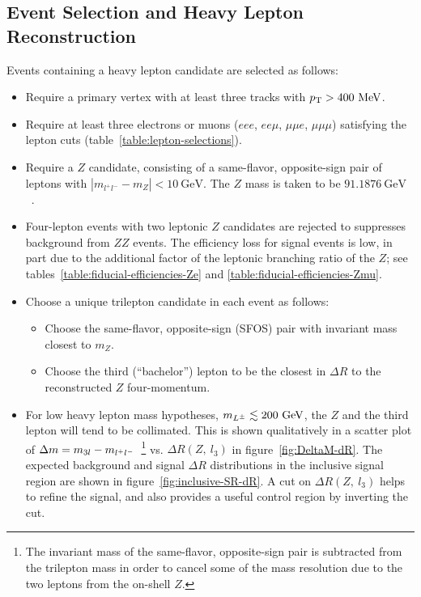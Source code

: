 \subsection{Event Selection and Heavy Lepton Reconstruction}\label{sec:event-3l-selection}
Events containing a heavy lepton candidate are selected as follows:
\begin{itemize}
	\item Require a primary vertex with at least three tracks with $p_{\text{T}}>400~\mbox{MeV}$.
	\item Require at least three electrons or muons ($eee$, $ee\mu$, $\mu\mu e$, $\mu\mu\mu$) satisfying the lepton cuts (table~\ref{table:lepton-selections}). 
	\item Require a $Z$ candidate, consisting of a same-flavor, opposite-sign pair of leptons with $|m_{l^+l^-}-m_{Z}|<10~\mbox{GeV}$. The $Z$ mass is taken to be $91.1876~\mbox{GeV}$~\cite{PhysRevD.86.010001}. 
	\item Four-lepton events with two leptonic $Z$ candidates are rejected to suppresses background from $ZZ$ events. The efficiency loss for signal events is low, in part due to the additional factor of the leptonic branching ratio of the $Z$; see tables~\ref{table:fiducial-efficiencies-Ze} and \ref{table:fiducial-efficiencies-Zmu}. 
	\item Choose a unique trilepton candidate in each event as follows:
	\begin{itemize}
		\item Choose the same-flavor, opposite-sign (SFOS) pair with invariant mass closest to $m_{Z}$.
		\item Choose the third (``bachelor'') lepton to be the closest in $\Delta R$ to the reconstructed $Z$ four-momentum.
	\end{itemize}
  \item For low heavy lepton mass hypotheses, $m_{L^{\pm}}\lesssim 200~\mbox{GeV}$, the $Z$ and the third lepton will tend to be collimated. This is shown qualitatively in a scatter plot of $\Delta m=m_{3l}-m_{l^+l^-}$~\footnote{The invariant mass of the same-flavor, opposite-sign pair is subtracted from the trilepton mass in order to cancel some of the mass resolution due to the two leptons from the on-shell $Z$.} vs. $\Delta R(Z,\ l_3)$ in figure~\ref{fig:DeltaM-dR}. The expected background and signal $\Delta R$ distributions in the inclusive signal region are shown in figure~\ref{fig:inclusive-SR-dR}. A cut on $\Delta R(Z,\ l_3)$ helps to refine the signal, and also provides a useful control region by inverting the cut.


\end{itemize}
